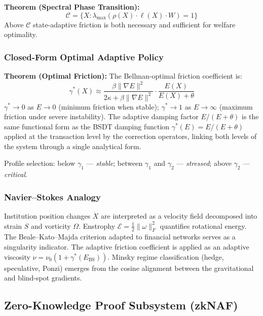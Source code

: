 \documentclass[12pt,a4paper]{article}
\begin{document}
\textbf{Theorem (Spectral Phase Transition):}
\begin{equation}
\mathcal{C} = \{X:\lambda_{\max}(\rho(X)\cdot\ell(X)\cdot W)=1\}
\end{equation}
Above $\mathcal{C}$ state-adaptive friction is both necessary and
sufficient for welfare optimality.

\subsubsection{Closed-Form Optimal Adaptive Policy}

\textbf{Theorem (Optimal Friction):} The Bellman-optimal friction
coefficient is:
\begin{equation}
\gamma^*(X) \approx
\frac{\beta\|\nabla E\|^2}{2\kappa+\beta\|\nabla E\|^2}
\cdot\frac{E(X)}{E(X)+\theta}
\end{equation}
$\gamma^*\to 0$ as $E\to 0$ (minimum friction when stable);
$\gamma^*\to 1$ as $E\to\infty$ (maximum friction under severe
instability). The adaptive damping factor $E/(E+\theta)$ is the same
functional form as the BSDT damping function $\gamma^*(E)=E/(E+\theta)$
applied at the transaction level by the correction operators, linking
both levels of the system through a single analytical form.

Profile selection: below $\gamma_1$ --- \textit{stable};
between $\gamma_1$ and $\gamma_2$ --- \textit{stressed};
above $\gamma_2$ --- \textit{critical}.

\subsubsection{Navier--Stokes Analogy}

Institution position changes $\dot{X}$ are interpreted as a velocity
field decomposed into strain $S$ and vorticity $\Omega$. Enstrophy
$\mathcal{E}=\frac{1}{2}\|\omega\|_F^2$ quantifies rotational energy.
The Beale--Kato--Majda criterion adapted to financial networks serves
as a singularity indicator. The adaptive friction coefficient is applied
as an adaptive viscosity $\nu=\nu_0(1+\gamma^*(E_{\mathrm{BS}}))$.
Minsky regime classification (hedge, speculative, Ponzi) emerges from
the cosine alignment between the gravitational and blind-spot gradients.

\subsection{Zero-Knowledge Proof Subsystem (zkNAF)}
\label{sec:zknaf}
\end{document}
